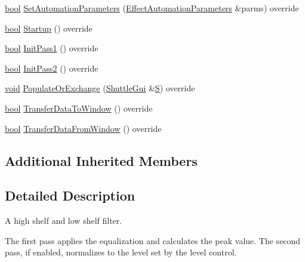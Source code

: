 \begin{DoxyCompactItemize}
\item 
\hyperlink{mac_2config_2i386_2lib-src_2libsoxr_2soxr-config_8h_abb452686968e48b67397da5f97445f5b}{bool} \hyperlink{class_effect_bass_treble_abc09fe462fb9b668bc51673866dbda1a}{Set\+Automation\+Parameters} (\hyperlink{class_effect_automation_parameters}{Effect\+Automation\+Parameters} \&parms) override
\item 
\hyperlink{mac_2config_2i386_2lib-src_2libsoxr_2soxr-config_8h_abb452686968e48b67397da5f97445f5b}{bool} \hyperlink{class_effect_bass_treble_a3ae786249b8c4464c7c62e17425d3bf8}{Startup} () override
\item 
\hyperlink{mac_2config_2i386_2lib-src_2libsoxr_2soxr-config_8h_abb452686968e48b67397da5f97445f5b}{bool} \hyperlink{class_effect_bass_treble_a4ce31e2ba64580bb29519d144b35a27c}{Init\+Pass1} () override
\item 
\hyperlink{mac_2config_2i386_2lib-src_2libsoxr_2soxr-config_8h_abb452686968e48b67397da5f97445f5b}{bool} \hyperlink{class_effect_bass_treble_afe71ebe8e378ac3fddc96428bf225fa3}{Init\+Pass2} () override
\item 
\hyperlink{sound_8c_ae35f5844602719cf66324f4de2a658b3}{void} \hyperlink{class_effect_bass_treble_ab1e908c3c8b90f086bcea4252a4791ee}{Populate\+Or\+Exchange} (\hyperlink{class_shuttle_gui}{Shuttle\+Gui} \&\hyperlink{xlftab_8c_af933676109efed7ab34cea71d748a517}{S}) override
\item 
\hyperlink{mac_2config_2i386_2lib-src_2libsoxr_2soxr-config_8h_abb452686968e48b67397da5f97445f5b}{bool} \hyperlink{class_effect_bass_treble_acef835b96cb138caf22e8fdd369dd082}{Transfer\+Data\+To\+Window} () override
\item 
\hyperlink{mac_2config_2i386_2lib-src_2libsoxr_2soxr-config_8h_abb452686968e48b67397da5f97445f5b}{bool} \hyperlink{class_effect_bass_treble_a27f345d48d423205b6f86e58bc04211c}{Transfer\+Data\+From\+Window} () override
\end{DoxyCompactItemize}
\subsection*{Additional Inherited Members}


\subsection{Detailed Description}
A high shelf and low shelf filter. 

The first pass applies the equalization and calculates the peak value. The second pass, if enabled, normalizes to the level set by the level control. 


